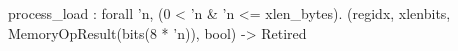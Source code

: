process_load : forall 'n, (0 < 'n & 'n <= xlen_bytes). (regidx, xlenbits, MemoryOpResult(bits(8 * 'n)), bool) -> Retired